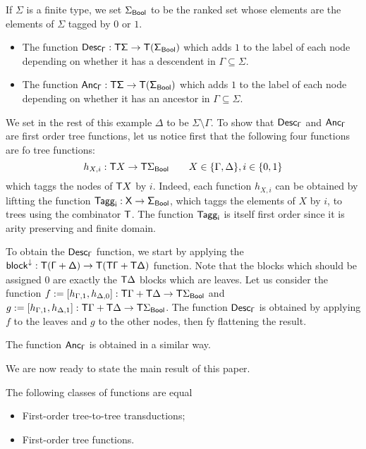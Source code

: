 \bigskip
\noindent\begin{example}
If $\Sigma$ is a finite type, we set $\Sigma_{\sf{Bool}}$ to be the ranked set whose elements are the elements of $\Sigma$ tagged by $0$ or $1$. 
\begin{itemize}
\item The function $\sf{Desc}_\Gamma: \mathsf T \Sigma \to \mathsf T (\Sigma_{\sf{Bool}})$ which 
adds $1$ to the label of each node depending on whether it has a descendent in $\Gamma\subseteq \Sigma$.
\item The function $\sf{Anc}_\Gamma: \mathsf T \Sigma \to \mathsf T (\Sigma_{\sf{Bool}})$ which 
adds $1$ to the label of each node depending on whether it has an ancestor in $\Gamma\subseteq \Sigma$.
\end{itemize}

We set in the rest of this example $\Delta$ to be $\Sigma\setminus\Gamma$.
To show that $\sf{Desc}_\Gamma$ and $\sf{Anc}_\Gamma$ are first order tree functions, let us notice first that the following four functions are fo tree functions:
\[h_{X,i}:\mathsf T X \to \mathsf T \Sigma_{\sf{Bool}}\qquad X\in \{\Gamma,\Delta\}, i\in\{0,1\}\]
which taggs the nodes of $\mathsf T X$ by $i$. 
Indeed, each function $h_{X,i}$ can be obtained by liftting the function $\sf{Tagg}_i:X\to\Sigma_{Bool}$, which taggs the elements of $X$ by $i$, to trees using the combinator $\mathsf T$. The function $\sf{Tagg}_i$ is itself first order since it is arity preserving and finite domain.

To obtain the $\sf{Desc}_\Gamma$ function, we start by applying the $\sf{block}^{\downarrow}:\mathsf T{(\Gamma+\Delta)}\to \mathsf T{(\mathsf T\Gamma+\mathsf T\Delta)}$ function. Note that the blocks which should be assigned $0$ are exactly the $\mathsf T \Delta$ blocks which are leaves. Let us consider the function $f:=[h_{\Gamma,1},h_{\Delta,0}]:\mathsf T\Gamma+\mathsf T \Delta\to \mathsf T\Sigma_{\sf{Bool}}$ and $g:=[h_{\Gamma,1},h_{\Delta,1}]:\mathsf T\Gamma+\mathsf T \Delta\to \mathsf T\Sigma_{\sf{Bool}}$. The function $\sf{Desc}_\Gamma$
is obtained by applying $f$ to the leaves and $g$ to the other nodes, then fy flattening the result.

\medskip
The function $\sf{Anc}_\Gamma$ is obtained in a similar way.    
\end{example}


We are now ready to state the main result of this paper. 
\begin{theorem}\label{thm:main}
    The following classes of functions are equal\begin{itemize}
        \item First-order tree-to-tree transductions;
        \item First-order tree functions.
    \end{itemize}
\end{theorem}

